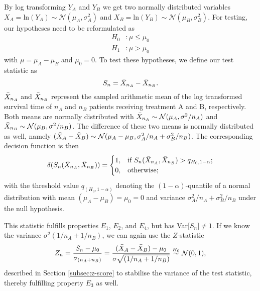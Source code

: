 By log transforming $Y_A$ and $Y_B$ we get two normally distributed variables ${X_A = \text{ln}(Y_A) \sim \mathcal{N}(\mu_A, \sigma_A^2)}$ and $X_B = \text{ln}(Y_B) \sim \mathcal{N}(\mu_B, \sigma_B^2)$. For testing, our hypotheses need to be reformulated as %
\begin{align*}
    H_0 &: \mu \leq \mu_0 \\
    H_1 &: \mu > \mu_0
\end{align*}
with $\mu = \mu_A-\mu_B$ and $\mu_0 = 0$. To test these hypotheses, we define our test statistic as $$S_n = \Bar{X}_{n_A}-\Bar{X}_{n_B}.$$
$\Bar{X}_{n_A}$ and $\Bar{X}_{n_B}$ represent the sampled arithmetic mean of the log transformed survival time of $n_A$ and $n_B$ patients receiving treatment A and B, respectively. Both means are normally distributed with ${\Bar{X}_{n_A}\sim \mathcal{N}(\mu_A,\sigma^2/n_A)}$ and ${\Bar{X}_{n_B}\sim \mathcal{N}(\mu_B,\sigma^2/n_B)}$. The difference of these two means is normally distributed as well, namely ${(\Bar{X}_A-\Bar{X}_B) \sim \mathcal{N}(\mu_A-\mu_B, \sigma_A^2/n_A+\sigma_B^2/n_B)}$. The corresponding decision function is then
\begin{align*}
    \delta(S_n(\Bar{X}_{n_A},\Bar{X}_{n_B})) = \begin{cases} 1, & \text{if } S_n(\Bar{X}_{n_A},\Bar{X}_{n_B}) > q_{H_0,1-\alpha}; \\ 0, & \mbox{otherwise;}\end{cases}
\end{align*}
with the threshold value $q_{(H_0,1-\alpha)}$ denoting the $(1-\alpha)$-quantile of a normal distribution with mean ${(\mu_A-\mu_B) = \mu_0 = 0}$ and variance ${\sigma_A^2/n_A+\sigma_B^2/n_B}$ under the null hypothesis.\par
This statistic fulfills properties $E_1$, $E_2$, and $E_4$, but has Var[$S_n] \neq 1$. If we know the variance ${\sigma^2(1/n_A+1/n_B)}$, we can again use the $Z$-statistic
$$Z_n = \frac{S_n-\mu_0}{\sigma_{(n_A+n_B)}} = \frac{(\Bar{X}_A-\Bar{X}_B)-\mu_0}{\sigma\sqrt{(1/n_A+1/n_B)}}\overset{H_0}{\sim} \mathcal{N}(0,1),$$ 
described in Section \ref{subsec:z-score} to stabilise the variance of the test statistic, thereby fulfilling property $E_3$ as well.\par

